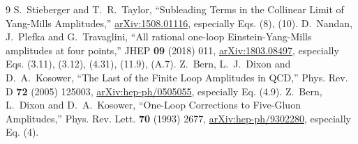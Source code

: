\documentclass[UTF8,11pt,a4paper]{ctexart}
\begin{document}
\begin{thebibliography}{9}
 S.~Stieberger and T.~R.~Taylor, ``Subleading Terms in the Collinear Limit of Yang-Mills Amplitudes,'' \href{https://arxiv.org/abs/1508.01116}{arXiv:1508.01116}, especially Eqs. (8), (10).
 D.~Nandan, J.~Plefka and G.~Travaglini, ``All rational one-loop Einstein-Yang-Mills amplitudes at four points,'' JHEP \textbf{09} (2018) 011, \href{https://arxiv.org/abs/1803.08497}{arXiv:1803.08497}, especially Eqs. (3.11), (3.12), (4.31), (11.9), (A.7).
 Z.~Bern, L.~J.~Dixon and D.~A.~Kosower, ``The Last of the Finite Loop Amplitudes in QCD,'' Phys. Rev. D \textbf{72} (2005) 125003, \href{https://arxiv.org/abs/hep-ph/0505055}{arXiv:hep-ph/0505055}, especially Eq. (4.9).
 Z.~Bern, L.~Dixon and D.~A.~Kosower, ``One-Loop Corrections to Five-Gluon Amplitudes,'' Phys. Rev. Lett. \textbf{70} (1993) 2677, \href{https://arxiv.org/abs/hep-ph/9302280}{arXiv:hep-ph/9302280}, especially Eq. (4).
\end{thebibliography}
\end{document}
